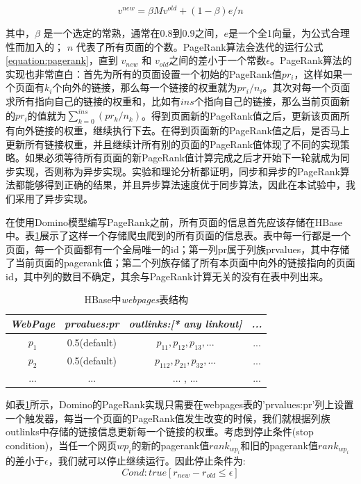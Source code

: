 \begin{equation}
  \label{equation:pagerank}
v^{new}=\beta M v^{old} + (1 - \beta)e/n
\end{equation}

其中，$\beta$ 是一个选定的常熟，通常在0.8到0.9之间，$e$是一个全1向量，为公式合理性而加入的； $n$ 代表了所有页面的个数。PageRank算法会迭代的运行公式 \ref{equation:pagerank}，直到 $v_{new}$ 和 $v_{old}$之间的差小于一个常数$\epsilon$。PageRank算法的实现也非常直白：首先为所有的页面设置一个初始的PageRank值$pr_i$，这样如果一个页面有$k_i$个向外的链接，那么每一个链接的权重就为$pr_i/n_i$。其次对每一个页面求所有指向自己的链接的权重和，比如有$ins$个指向自己的链接，那么当前页面新的$pr_i$的值就为$\sum_{k=0}^{ins}(pr_k/n_k)$。得到页面新的PageRank值之后，更新该页面所有向外链接的权重，继续执行下去。在得到页面新的PageRank值之后，是否马上更新所有链接权重，并且继续计所有别的页面的PageRank值体现了不同的实现策略。如果必须等待所有页面的新PageRank值计算完成之后才开始下一轮就成为同步实现，否则称为异步实现。实验和理论分析都证明，同步和异步的PageRank算法都能够得到正确的结果，并且异步算法速度优于同步算法，因此在本试验中，我们采用了异步实现。

在使用Domino模型编写PageRank之前，所有页面的信息首先应该存储在HBase中。表\ref{table:tm}展示了这样一个存储爬虫爬到的所有页面的信息表。表中每一行都是一个页面，每一个页面都有一个全局唯一的id；第一列pr属于列族prvalues，其中存储了当前页面的pagerank值；第二个列族存储了所有本页面中向外的链接指向的页面id，其中列的数目不确定，其余与PageRank计算无关的没有在表中列出来。

\begin{table}[ht]\small
\caption{HBase中\textit{webpages}表结构}
\label{table:tm}
\centering
\begin{tabular}{|c|c|c|c|}
\hline
\textit{WebPage} & \textit{prvalues:pr} & \textit{outlinks:[* any linkout]} & \textit{...}\\
\hline
$p_1$ & 0.5(default) & $p_{11}, p_{12}, p_{13}, ...$ & ...\\
\hline
$p_2$ & 0.5(default) & $p_{112}, p_{21}, p_{32}, ...$& ... \\
\hline
... & ... & ... , ... & ... \\
\hline
\end{tabular}
\end{table}

如表\ref{table:tm}所示，Domino的PageRank实现只需要在webpages表的'prvalues:pr'列上设置一个触发器，每当一个页面的PageRank值发生改变的时候，我们就根据列族outlinks中存储的链接信息更新每一个链接的权重。考虑到停止条件(stop condition)，当任一个网页$wp_i$的新的pagerank值$rank^{'}_{wp_i}$和旧的pagerank值$rank_{wp_i}$的差小于$\epsilon$，我们就可以停止继续运行。因此停止条件为:
\begin{equation}
  Cond:true [r_{new} - r_{old} \leq  \epsilon]
\end{equation}

